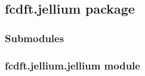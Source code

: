 \documentclass[letterpaper,10pt,english]{sphinxmanual}
\begin{document}
\subsection{fcdft.jellium package}
\label{\detokenize{fcdft.jellium:fcdft-jellium-package}}\label{\detokenize{fcdft.jellium::doc}}

\subsubsection{Submodules}
\label{\detokenize{fcdft.jellium:submodules}}

\subsubsection{fcdft.jellium.jellium module}
\label{\detokenize{fcdft.jellium:module-fcdft.jellium.jellium}}\label{\detokenize{fcdft.jellium:fcdft-jellium-jellium-module}}
\end{document}
